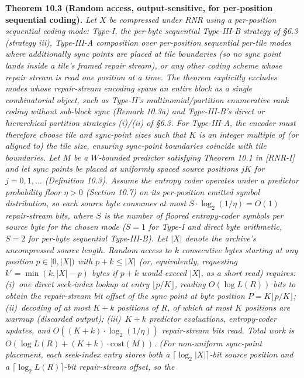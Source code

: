\documentclass[
]{article}
\begin{document}
\textbf{Theorem 10.3 (Random access, output-sensitive, for
per-position sequential coding).} \emph{Let $X$ be compressed under
RNR using a \emph{per-position sequential} coding mode: Type-I, the
per-byte sequential Type-III-B strategy of §6.3 (strategy iii),
Type-III-A composition over per-position sequential per-tile modes
where additionally sync points are placed at tile boundaries (so
no sync point lands inside a tile's framed repair stream), or any
other coding scheme whose repair stream is read one position at a
time. The theorem explicitly excludes modes whose repair-stream
encoding spans an entire block as a single combinatorial object,
such as Type-II's multinomial/partition enumerative rank coding
without sub-block sync (Remark 10.3a) and Type-III-B's direct or
hierarchical partition strategies (i)/(ii) of §6.3. For Type-III-A,
the encoder must therefore choose tile and sync-point sizes such
that $K$ is an integer multiple of (or aligned to) the tile size,
ensuring sync-point boundaries coincide with tile boundaries. Let $M$ be a $W$-bounded predictor satisfying Theorem 10.1 in [RNR-I]
and let sync points be placed
at uniformly spaced source positions $j K$ for $j = 0, 1, \dots$
(Definition 10.3). Assume the entropy coder operates under a
predictor probability floor $\eta > 0$ (Section 10.7) on its
per-position emitted symbol distribution, so each source byte
consumes at most $S \cdot \log_2(1/\eta) = O(1)$ repair-stream
bits, where $S$ is the number of floored entropy-coder symbols per
source byte for the chosen mode ($S = 1$ for Type-I and direct byte
arithmetic, $S = 2$ for per-byte sequential Type-III-B). Let $|X|$ denote the archive's uncompressed source length.
Random access to $k$ consecutive bytes starting at any position
$p \in [0, |X|)$ with $p + k \leq |X|$ (or, equivalently, requesting
$k' = \min(k, |X| - p)$ bytes if $p + k$ would exceed $|X|$, as a
short read) requires: (i)~one direct seek-index lookup at
entry $\lfloor p/K \rfloor$, reading $O(\log L(R))$ bits to obtain
the repair-stream bit offset of the sync point at byte position
$P = K \lfloor p/K \rfloor$; (ii)~decoding of at most $K + k$
positions of $R$, of which at most $K$ positions are warmup
(discarded output); (iii)~$K + k$ predictor evaluations,
entropy-coder updates, and $O((K+k) \cdot \log_2(1/\eta))$
repair-stream bits read. Total work is
$O(\log L(R) + (K + k) \cdot \mathrm{cost}(M))$. (For non-uniform
sync-point placement, each seek-index entry stores both a
$\lceil \log_2 |X| \rceil$-bit source position and a
$\lceil \log_2 L(R) \rceil$-bit repair-stream offset, so the
}
\end{document}
